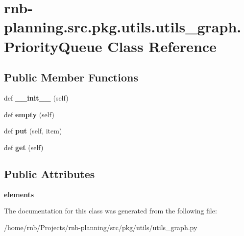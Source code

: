 \hypertarget{classrnb-planning_1_1src_1_1pkg_1_1utils_1_1utils__graph_1_1_priority_queue}{}\section{rnb-\/planning.src.\+pkg.\+utils.\+utils\+\_\+graph.\+Priority\+Queue Class Reference}
\label{classrnb-planning_1_1src_1_1pkg_1_1utils_1_1utils__graph_1_1_priority_queue}
\subsection*{Public Member Functions}
\begin{DoxyCompactItemize}
\item 
\mbox{\label{classrnb-planning_1_1src_1_1pkg_1_1utils_1_1utils__graph_1_1_priority_queue_aa03f98e024fd4d06e5d09839214350e9}} 
def {\bfseries \+\_\+\+\_\+init\+\_\+\+\_\+} (self)
\item 
\mbox{\label{classrnb-planning_1_1src_1_1pkg_1_1utils_1_1utils__graph_1_1_priority_queue_ab4c1afaefe8f1673f1fd6457286e98bf}} 
def {\bfseries empty} (self)
\item 
\mbox{\label{classrnb-planning_1_1src_1_1pkg_1_1utils_1_1utils__graph_1_1_priority_queue_a146c5247d5bb1ec08ae7a374534ffebc}} 
def {\bfseries put} (self, item)
\item 
\mbox{\label{classrnb-planning_1_1src_1_1pkg_1_1utils_1_1utils__graph_1_1_priority_queue_afe3f19b78a6bd46879fdca1bb81dd193}} 
def {\bfseries get} (self)
\end{DoxyCompactItemize}
\subsection*{Public Attributes}
\begin{DoxyCompactItemize}
\item 
\mbox{\label{classrnb-planning_1_1src_1_1pkg_1_1utils_1_1utils__graph_1_1_priority_queue_a36389dfa78e85ae1ff232627e227e972}} 
{\bfseries elements}
\end{DoxyCompactItemize}


The documentation for this class was generated from the following file\+:\begin{DoxyCompactItemize}
\item 
/home/rnb/\+Projects/rnb-\/planning/src/pkg/utils/utils\+\_\+graph.\+py\end{DoxyCompactItemize}
